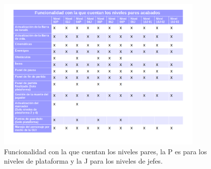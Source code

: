 		\begin{figure}[h]
    			\centering
    			\includegraphics[width=0.9\textwidth]{04ResultadosObetnidos/imagenes/funcionalidadPares.png}
    			\caption{Funcionalidad con la que cuentan los niveles pares, la P es 
    			para los niveles de plataforma y la J para los niveles de jefes.}
    			\label{fig:NivelesPares}
		\end{figure}